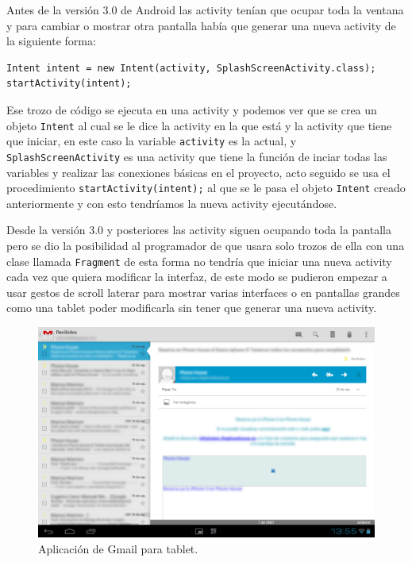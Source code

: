 \begin{itemize}
Antes de la versión 3.0 de Android las activity tenían que ocupar toda la ventana y para cambiar o mostrar otra pantalla había que generar una nueva activity de la siguiente forma:

\begin{lstlisting}[style=Java]
Intent intent = new Intent(activity, SplashScreenActivity.class);
startActivity(intent);
\end{lstlisting}

Ese trozo de código se ejecuta en una activity y podemos ver que se crea un objeto \lstinline{Intent} al cual se le dice la activity en la que está y la activity que tiene que iniciar, en este caso la variable \lstinline{activity} es la actual, y \lstinline{SplashScreenActivity} es una activity que tiene la función de inciar todas las variables y realizar las conexiones básicas en el proyecto, acto seguido se usa el procedimiento \lstinline{startActivity(intent);} al que se le pasa el objeto \lstinline{Intent} creado anteriormente y con esto tendríamos la nueva activity ejecutándose.

Desde la versión 3.0 y posteriores las activity siguen ocupando toda la pantalla pero se dio la posibilidad al programador de que usara solo trozos de ella con una clase llamada \lstinline{Fragment} de esta forma no tendría que iniciar una nueva activity cada vez que quiera modificar la interfaz, de este modo se pudieron empezar a usar gestos de scroll laterar para mostrar varias interfaces o en pantallas grandes como una tablet poder modificarla sin tener que generar una nueva activity. 
\begin{figure}
  \centering
    \includegraphics[scale=0.3]{./Android/imagenes/gmailTablet.png}
  \caption{Aplicación de Gmail para tablet.}
  \label{fig:gmailTablet}
\end{figure}


\end{itemize}
